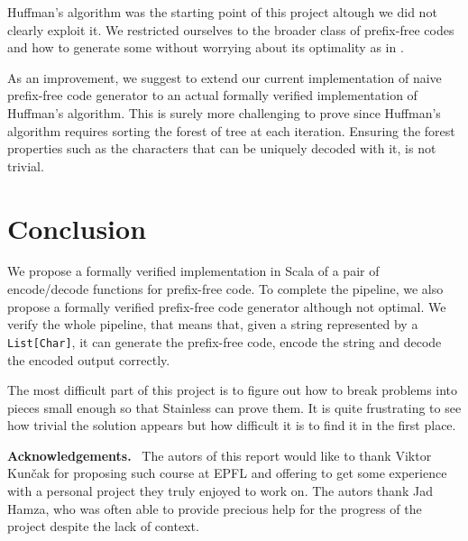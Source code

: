 \documentclass[a4paper,UKenglish,cleveref, autoref, thm-restate]{lipics-v2021}
\begin{document}
Huffman's algorithm was the starting point of this project altough we did not clearly exploit it. We restricted ourselves to the broader class of prefix-free codes and how to generate some without worrying about its optimality as in \cite{blanchette}. 

As an improvement, we suggest to extend our current implementation of naive prefix-free code generator to an actual formally verified implementation of Huffman's algorithm. This is surely more challenging to prove since Huffman's algorithm requires sorting the forest of tree at each iteration. Ensuring the forest properties such as the characters that can be uniquely decoded with it, is not trivial.

\section{Conclusion}
We propose a formally verified implementation in Scala of a pair of encode/decode functions for prefix-free code. To complete the pipeline, we also propose a formally verified prefix-free code generator although not optimal.
We verify the whole pipeline, that means that, given a string represented by a \lstinline{List[Char]}, it can generate the prefix-free code, encode the string and decode the encoded output correctly.

The most difficult part of this project is to figure out how to break problems into pieces small enough so that Stainless can prove them. 
It is quite frustrating to see how trivial the solution appears but how difficult it is to find it in the first place.


\vspace{0.5cm} %
\noindent %
\textbf{\large Acknowledgements.}\ %
The autors of this report would like to thank Viktor Kun\v{c}ak for proposing such course at EPFL and offering to get some experience with a personal project they truly enjoyed to work on. The autors thank Jad Hamza, who was often able to provide precious help for the progress of the project despite the lack of context.


\end{document}
